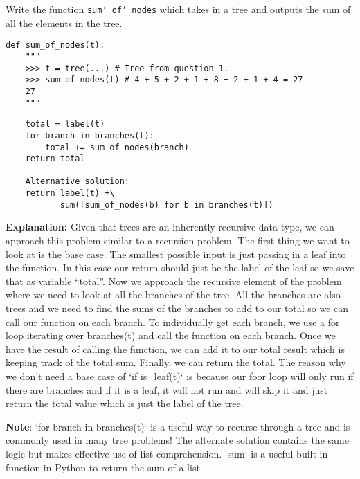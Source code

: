 \begin{blocksection}
\question Write the function \texttt{sum\char`_of\char`_nodes} which takes in a
tree and outputs the sum of all the elements in the tree.
\end{blocksection}

\begin{lstlisting}
def sum_of_nodes(t):
    """
    >>> t = tree(...) # Tree from question 1.
    >>> sum_of_nodes(t) # 4 + 5 + 2 + 1 + 8 + 2 + 1 + 4 = 27
    27
    """
\end{lstlisting}
\begin{solution}
\begin{lstlisting}
    total = label(t)
    for branch in branches(t):
        total += sum_of_nodes(branch)
    return total

    Alternative solution:
    return label(t) +\
           sum([sum_of_nodes(b) for b in branches(t)])
\end{lstlisting}
\textbf{Explanation:}
Given that trees are an inherently recursive data type, we can approach this problem similar to a recursion problem. The first thing we want to look at is the base case. The smallest possible input is just passing in a leaf into the function. In this case our return should just be the label of the leaf so we save that as variable “total”. Now we approach the recursive element of the problem where we need to look at all the branches of the tree. All the branches are also trees and we need to find the sums of the branches to add to our total so we can call our function on each branch. To individually get each branch, we use a for loop iterating over branches(t) and call the function on each branch. Once we have the result of calling the function, we can add it to our total result which is keeping track of the total sum. Finally, we can return the total. The reason why we don’t need a base case of `if is\_leaf(t)` is because our foor loop will only run if there are branches and if it is a leaf, it will not run and will skip it and just return the total value which is just the label of the tree. 

\textbf{Note}: `for branch in branches(t)` is a useful way to recurse through a tree and is commonly used in many tree problems!
The alternate solution contains the same logic but makes effective use of list comprehension. `sum` is a useful built-in function in Python to return the sum of a list.

\end{solution}

